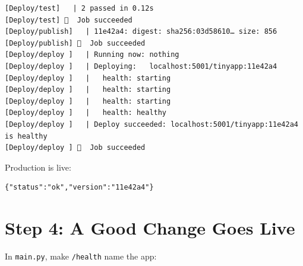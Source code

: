 \begin{codeblock}
\begin{Verbatim}[formatcom=\outputstyle]
[Deploy/test]   | 2 passed in 0.12s
[Deploy/test] 🏁  Job succeeded
[Deploy/publish]   | 11e42a4: digest: sha256:03d58610… size: 856
[Deploy/publish] 🏁  Job succeeded
[Deploy/deploy ]   | Running now: nothing
[Deploy/deploy ]   | Deploying:   localhost:5001/tinyapp:11e42a4
[Deploy/deploy ]   |   health: starting
[Deploy/deploy ]   |   health: starting
[Deploy/deploy ]   |   health: starting
[Deploy/deploy ]   |   health: healthy
[Deploy/deploy ]   | Deploy succeeded: localhost:5001/tinyapp:11e42a4 is healthy
[Deploy/deploy ] 🏁  Job succeeded
\end{Verbatim}
\end{codeblock}


Production is live:

\begin{codeblock}

\begin{Shaded}
\begin{Highlighting}[]
\end{Highlighting}
\end{Shaded}

\end{codeblock}

\begin{codeblock}
\begin{Verbatim}[formatcom=\outputstyle]
{"status":"ok","version":"11e42a4"}
\end{Verbatim}
\end{codeblock}


\section{Step 4: A Good Change Goes Live}\label{10-lab-deploy-on-every-push:step-4-a-good-change-goes-live}

In \texttt{main.py}, make \texttt{/health} name the app:

\begin{codeblock}

\begin{Shaded}
\begin{Highlighting}[]
    \NormalTok{ \{}\NormalTok{: }\NormalTok{, }\NormalTok{: }\NormalTok{\}}
\end{Highlighting}
\end{Shaded}

\end{codeblock}

